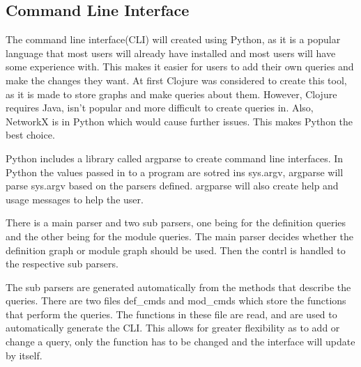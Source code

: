 
\subsection{Command Line Interface}\label{sub:Agda Tree CLI}

The command line interface(CLI) will created using Python, as it is a popular
language that most users will already have installed and most users will have
some experience with. This makes it easier for users to add their own queries
and make the changes they want. At first Clojure was considered to create this
tool, as it is made to store graphs and make queries about them. However,
Clojure requires Java, isn't popular and more difficult to create queries in.
Also, NetworkX is in Python which would cause further issues. This makes Python
the best choice.

Python includes a library called argparse to create command line interfaces. In
Python the values passed in to a program are sotred ins sys.argv, argparse will
parse sys.argv based on the parsers defined. argparse will also create help and
usage messages to help the user.

There is a main parser and two sub parsers, one being for the definition
queries and the other being for the module queries. The main parser decides
whether the definition graph or module graph should be used. Then the contrl is
handled to the respective sub parsers.

The sub parsers are generated automatically from the methods that describe the
queries. There are two files def\_cmds and mod\_cmds which store the functions
that perform the queries. The functions in these file are read, and are used to
automatically generate the CLI. This allows for greater flexibility as to add
or change a query, only the function has to be changed and the interface will
update by itself.


